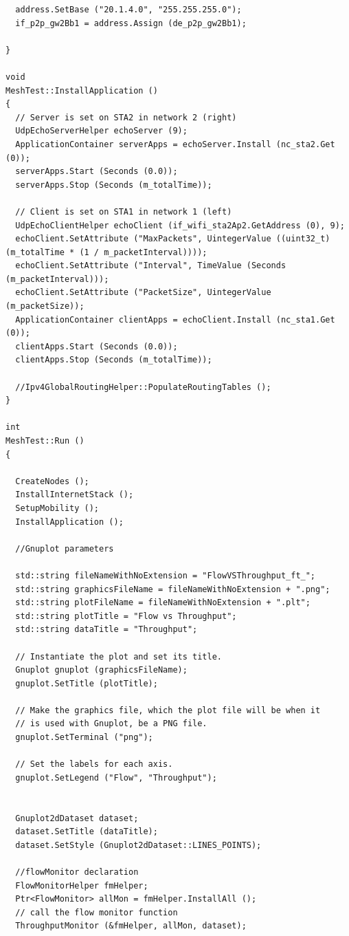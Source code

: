\documentclass[12pt,a4paper]{report}
\begin{document}
\begin{verbatim}
  address.SetBase ("20.1.4.0", "255.255.255.0");
  if_p2p_gw2Bb1 = address.Assign (de_p2p_gw2Bb1);

}

void
MeshTest::InstallApplication ()
{
  // Server is set on STA2 in network 2 (right)
  UdpEchoServerHelper echoServer (9);
  ApplicationContainer serverApps = echoServer.Install (nc_sta2.Get (0));
  serverApps.Start (Seconds (0.0));
  serverApps.Stop (Seconds (m_totalTime));

  // Client is set on STA1 in network 1 (left)
  UdpEchoClientHelper echoClient (if_wifi_sta2Ap2.GetAddress (0), 9);
  echoClient.SetAttribute ("MaxPackets", UintegerValue ((uint32_t) (m_totalTime * (1 / m_packetInterval))));
  echoClient.SetAttribute ("Interval", TimeValue (Seconds (m_packetInterval)));
  echoClient.SetAttribute ("PacketSize", UintegerValue (m_packetSize));
  ApplicationContainer clientApps = echoClient.Install (nc_sta1.Get (0));
  clientApps.Start (Seconds (0.0));
  clientApps.Stop (Seconds (m_totalTime));

  //Ipv4GlobalRoutingHelper::PopulateRoutingTables ();
}

int
MeshTest::Run ()
{

  CreateNodes ();
  InstallInternetStack ();
  SetupMobility ();
  InstallApplication ();

  //Gnuplot parameters

  std::string fileNameWithNoExtension = "FlowVSThroughput_ft_";
  std::string graphicsFileName = fileNameWithNoExtension + ".png";
  std::string plotFileName = fileNameWithNoExtension + ".plt";
  std::string plotTitle = "Flow vs Throughput";
  std::string dataTitle = "Throughput";

  // Instantiate the plot and set its title.
  Gnuplot gnuplot (graphicsFileName);
  gnuplot.SetTitle (plotTitle);

  // Make the graphics file, which the plot file will be when it
  // is used with Gnuplot, be a PNG file.
  gnuplot.SetTerminal ("png");

  // Set the labels for each axis.
  gnuplot.SetLegend ("Flow", "Throughput");


  Gnuplot2dDataset dataset;
  dataset.SetTitle (dataTitle);
  dataset.SetStyle (Gnuplot2dDataset::LINES_POINTS);

  //flowMonitor declaration
  FlowMonitorHelper fmHelper;
  Ptr<FlowMonitor> allMon = fmHelper.InstallAll ();
  // call the flow monitor function
  ThroughputMonitor (&fmHelper, allMon, dataset);



\end{verbatim}
\end{document}
